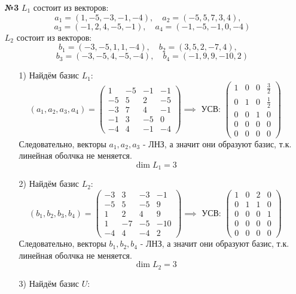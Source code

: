 \documentclass[a4paper]{article}
\begin{document}
\begin{enumerate}
    \item[\textbf{№3}]$L_1$ состоит из векторов:
    $$
    a_{1} = (1, -5, -3, -1, -4), \quad a_{2} = (-5, 5, 7, 3, 4), $$
    $$\quad a_{3} = (-1, 2, 4, -5, -1), \quad a_{4} = (-1, -5, -1, 0, -4)
    $$
    $L_2$ состоит из векторов:
    $$
    b_{1} = (-3, -5, 1, 1, -4), \quad b_{2} = (3, 5, 2, -7, 4), $$
    $$\quad b_{3} = (-3, -5, 4, -5, -4), \quad b_{4} = (-1, 9, 9, -10, 2)
    $$
    \begin{enumerate}
        \item[1)]
        Найдём базис $L_1$:
        $$(a_1, a_2, a_3, a_4) =\begin{pmatrix}
            1 & -5 & -1 & -1 \\
            -5 & 5 & 2 & -5 \\
            -3 & 7 & 4 & -1 \\
            -1 & 3 & -5 & 0 \\
            -4 & 4 & -1 & -4
        \end{pmatrix}\implies \text{ УСВ: }\begin{pmatrix}
            1 & 0 & 0 & \frac{3}{2} \\
            0 & 1 & 0 & \frac{1}{2} \\
            0 & 0 & 1 & 0 \\
            0 & 0 & 0 & 0 \\
            0 & 0 & 0 & 0
        \end{pmatrix}$$
        Следовательно, векторы $a_1, a_2, a_3$ - ЛНЗ, а значит они образуют базис, т.к. линейная оболчка не меняется.
        $$\dim L_1 = 3$$
        \item[2)]
        Найдём базис $L_2$:
        $$(b_1, b_2, b_3, b_4) = \begin{pmatrix}
            -3 & 3 & -3 & -1 \\
            -5 & 5 & -5 & 9 \\
            1 & 2 & 4 & 9 \\
            1 & -7 & -5 & -10 \\
            -4 & 4 & -4 & 2
        \end{pmatrix} \implies \text{ УСВ: } \begin{pmatrix}
            1 & 0 & 2 & 0 \\
            0 & 1 & 1 & 0 \\
            0 & 0 & 0 & 1 \\
            0 & 0 & 0 & 0 \\
            0 & 0 & 0 & 0
        \end{pmatrix}$$
        Следовательно, векторы $b_1, b_2, b_4$ - ЛНЗ, а значит они образуют базис, т.к. линейная оболчка не меняется.
        $$\dim L_2 = 3$$
        \item[3)]
        Найдём базис $U$:


\end{enumerate}
\end{enumerate}
\end{document}
